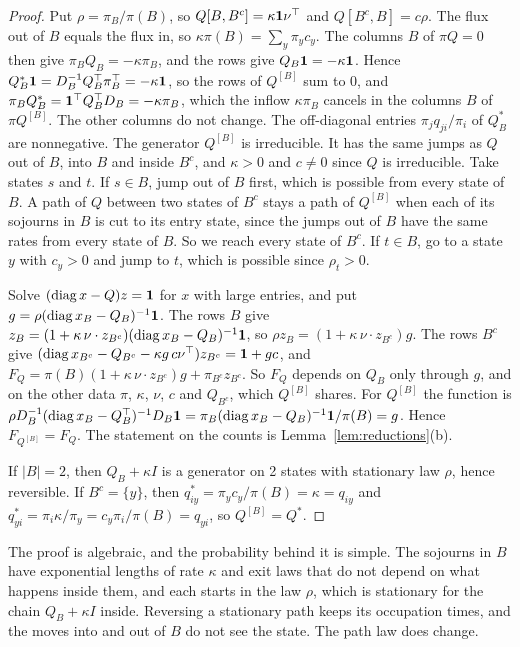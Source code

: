 \begin{proof}
Put $\rho=\pi_B/\pi(B)$, so $Q[B,B^c]=\kappa\mathbf{1}\nu^\top$ and $Q[B^c,B]=c\rho$. The flux out of
$B$ equals the flux in, so $\kappa\pi(B)=\sum_y\pi_yc_y$. The columns $B$ of $\pi Q=0$ then give
$\pi_BQ_B=-\kappa\pi_B$, and the rows give $Q_B\mathbf{1}=-\kappa\mathbf{1}$. Hence
$Q^*_B\mathbf{1}=D_B^{-1}Q_B^\top\pi_B^\top=-\kappa\mathbf{1}$, so the rows of $Q^{[B]}$ sum to $0$, and
$\pi_BQ^*_B=\mathbf{1}^\top Q_B^\top D_B=-\kappa\pi_B$, which the inflow $\kappa\pi_B$ cancels in the
columns $B$ of $\pi Q^{[B]}$. The other columns do not change. The off-diagonal entries
$\pi_jq_{ji}/\pi_i$ of $Q^*_B$ are nonnegative. The generator $Q^{[B]}$ is irreducible. It has the
same jumps as $Q$ out of $B$, into $B$ and inside $B^c$, and $\kappa>0$ and $c\ne0$ since $Q$ is
irreducible. Take states $s$ and $t$. If $s\in B$, jump out of $B$ first, which is possible from
every state of $B$. A path of $Q$ between two states of $B^c$ stays a path of $Q^{[B]}$ when each of
its sojourns in $B$ is cut to its entry state, since the jumps out of $B$ have the same rates from
every state of $B$. So we reach every state of $B^c$. If $t\in B$, go to a state $y$ with $c_y>0$
and jump to $t$, which is possible since $\rho_t>0$.

Solve $(\operatorname{diag}x-Q)z=\mathbf{1}$ for $x$ with large entries, and put
$g=\rho(\operatorname{diag}x_B-Q_B)^{-1}\mathbf{1}$. The rows $B$ give
$z_B=(1+\kappa\,\nu\cdot z_{B^c})(\operatorname{diag}x_B-Q_B)^{-1}\mathbf{1}$, so
$\rho z_B=(1+\kappa\,\nu\cdot z_{B^c})g$. The rows $B^c$ give
$(\operatorname{diag}x_{B^c}-Q_{B^c}-\kappa g\,c\nu^\top)z_{B^c}=\mathbf{1}+gc$, and
$F_Q=\pi(B)(1+\kappa\,\nu\cdot z_{B^c})g+\pi_{B^c}z_{B^c}$. So $F_Q$ depends on $Q_B$ only through
$g$, and on the other data $\pi$, $\kappa$, $\nu$, $c$ and $Q_{B^c}$, which $Q^{[B]}$ shares. For
$Q^{[B]}$ the function is
$\rho D_B^{-1}(\operatorname{diag}x_B-Q_B^\top)^{-1}D_B\mathbf{1}=\pi_B(\operatorname{diag}x_B-Q_B)^{-1}\mathbf{1}/\pi(B)=g$.
Hence $F_{Q^{[B]}}=F_Q$. The statement on the counts is Lemma~\ref{lem:reductions}(b).

If $|B|=2$, then $Q_B+\kappa I$ is a generator on 2 states with stationary law $\rho$, hence
reversible. If $B^c=\{y\}$, then $q^*_{iy}=\pi_yc_y/\pi(B)=\kappa=q_{iy}$ and
$q^*_{yi}=\pi_i\kappa/\pi_y=c_y\pi_i/\pi(B)=q_{yi}$, so $Q^{[B]}=Q^*$.
\end{proof}

The proof is algebraic, and the probability behind it is simple. The sojourns in $B$ have
exponential lengths of rate $\kappa$ and exit laws that do not depend on what happens inside
them, and each starts in the law $\rho$, which is stationary for the chain $Q_B+\kappa I$ inside.
Reversing a stationary path keeps its occupation times, and the moves into and out of $B$ do not
see the state. The path law does change.

